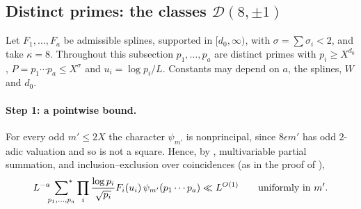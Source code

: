 \documentclass[11pt,colorlinks]{charlie}
\newcommand{\cD}{\mathcal{D}}
\begin{document}
\subsection{Distinct primes: the classes \texorpdfstring{$\cD(8,\pm1)$}{D(8,±1)}}\label{ssec:poisson}
Let $F_1,\dots,F_a$ be admissible splines, supported in $[d_0,\infty)$, with $\sigma=\sum\sigma_i<2$, and take $\kappa=8$. Throughout this subsection $p_1,\dots,p_a$ are distinct primes with $p_i\ge X^{d_0}$, $P=p_1\cdots p_a\le X^\sigma$ and $u_i=\log p_i/L$. Constants may depend on $a$, the splines, $W$ and $d_0$.

\paragraph{Step 1: a pointwise bound.}
For every odd $m'\le2X$ the character $\psi_{m'}$ is nonprincipal, since $8\epsilon m'$ has odd $2$-adic valuation and so is not a square. Hence, by , multivariable partial summation, and inclusion--exclusion over coincidences (as in the proof of ),
\begin{equation}\label{eq:pointwise}
 L^{-a}\sideset{}{^*}\sum_{p_1,\dots,p_a}\prod_i\frac{\log p_i}{\sqrt{p_i}}F_i(u_i)\,\psi_{m'}(p_1\cdots p_a)\ll L^{O(1)}\qquad\text{uniformly in }m'.
\end{equation}
\end{document}

